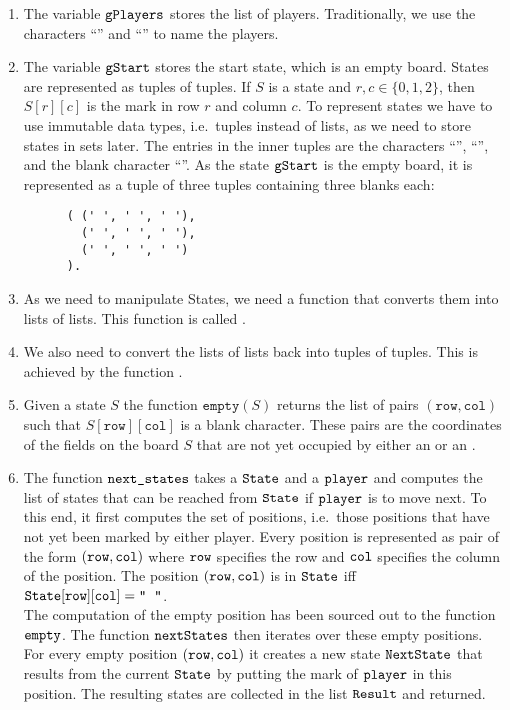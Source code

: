 \begin{enumerate}
\item The variable $\texttt{gPlayers}$ stores the list of players.  Traditionally, we use the characters
      ``'' and ``'' to name the players.   
\item The variable $\texttt{gStart}$ stores the start state, which is an empty board.
      States are represented as tuples of tuples.  If $S$ is a state and $r,c \in \{0,1,2\}$,
      then $S[r][c]$ is the mark in row $r$ and column $c$.
      To represent states we have to use immutable data types, i.e.~tuples instead of lists, as we need to
      store states in sets later.  The entries in the inner tuples are the characters 
      ``'', ``'', and the blank character ``\textts{ }''.
      As the state  $\texttt{gStart}$ is the empty board, it is represented as a tuple of three tuples
      containing three blanks each:
      \begin{Verbatim}
      ( (' ', ' ', ' '), 
        (' ', ' ', ' '), 
        (' ', ' ', ' ')
      ).     
      \end{Verbatim}
\item As we need to manipulate States, we need a function that converts them into lists of lists.
      This function is called .
\item We also need to convert the lists of lists back into tuples of tuples.  This is achieved by the function
      .
\item Given a state $S$ the function $\mathtt{empty}(S)$ returns the list of pairs 
      $(\mathtt{row}, \mathtt{col})$ such that $S[\mathtt{row}][\mathtt{col}]$ is a blank character.  These pairs are
      the coordinates of the fields on the board $S$ that are not yet occupied by either an  or an
      .   
\item The function $\texttt{next\_states}$ takes a $\texttt{State}$ and a $\texttt{player}$ and computes the list
      of states that can be reached from $\texttt{State}$ if $\texttt{player}$ is to move next.
      To this end, it first computes the set of  positions, i.e.~those positions that have not yet
      been marked by either player. Every position is represented as pair of the
      form $(\texttt{row}, \texttt{col})$ where $\texttt{row}$ specifies the row and $\texttt{col}$ specifies
      the column of the position.  The position $(\texttt{row}, \texttt{col})$ is  in
      $\texttt{State}$ iff
      \\[0.2cm]
      \hspace*{1.3cm}
      $\textts{State}[\textts{row}][\textts{col}] = \textts{\symbol{34}\;\;\symbol{34}}$.
      \\[0.2cm]
      The computation of the empty position has been sourced out to the function $\texttt{empty}$.
      The function $\texttt{nextStates}$ then iterates over these empty positions. For every 
      empty position $(\texttt{row}, \texttt{col})$ it creates a new state $\texttt{NextState}$ that results
      from the current $\texttt{State}$ by putting the mark of $\texttt{player}$ in this position.  
      The resulting states are collected in the list $\texttt{Result}$ and returned.


\end{enumerate}
